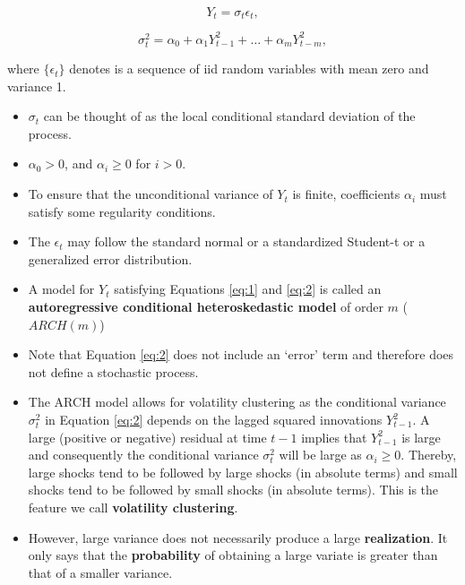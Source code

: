 \documentclass[]{book}
\providecommand{\tightlist}{%
  \setlength{\itemsep}{0pt}\setlength{\parskip}{0pt}}
\begin{document}
\begin{equation} \label{eq:1}
Y_t=\sigma_t\epsilon_t,
\end{equation}

\begin{equation} \label{eq:2}
\sigma_t^2 =\alpha_0+\alpha_1Y_{t-1}^2+\dots+\alpha_mY_{t-m}^2,
\end{equation}

where \(\{\epsilon_t\}\) denotes is a sequence of iid random variables with mean zero and variance 1.

\begin{itemize}
\tightlist
\item
  \(\sigma_t\) can be thought of as the local conditional standard deviation of the process.
\item
  \(\alpha_0>0\), and \(\alpha_i\geq0\) for \(i > 0\).
\item
  To ensure that the unconditional variance of \(Y_t\) is finite, coefficients \(\alpha_i\) must satisfy some regularity conditions.
\item
  The \(\epsilon_t\) may follow the standard normal or a standardized Student-t or a generalized error distribution.
\end{itemize}

\begin{itemize}
\item
  A model for \(Y_t\) satisfying Equations \ref{eq:1} and \ref{eq:2} is called an \textbf{autoregressive conditional heteroskedastic model} of order \(m\) (\(ARCH(m)\))
\item
  Note that Equation \ref{eq:2} does not include an `error' term and therefore does not define a stochastic process.
\item
  The ARCH model allows for volatility clustering as the conditional variance \(\sigma_t^2\) in Equation \ref{eq:2} depends on the lagged squared innovations \(Y^2_{t−1}\). A large (positive or negative) residual at time \(t − 1\) implies that \(Y^2_{t−1}\) is large and consequently the conditional variance \(\sigma_t^2\) will be large as \(\alpha_i ≥ 0\). Thereby, large shocks tend to be followed by large shocks (in absolute terms) and small shocks tend to be followed by small shocks (in absolute terms). This is the feature we call \textbf{volatility clustering}.
\item
  However, large variance does not necessarily produce a large \textbf{realization}. It only says that the \textbf{probability} of obtaining a large variate is greater than that of a smaller variance.
\end{itemize}
\end{document}
